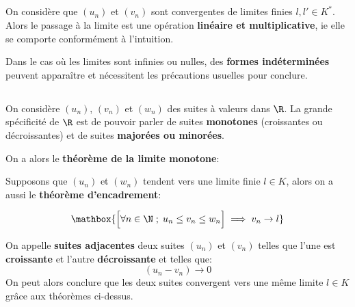 \subsection*{}
On considère que \((u_n)\) et \((v_n)\) sont convergentes de limites finies \(l, l' \in K^*\).\+
Alors le passage à la limite est une opération \textbf{linéaire et multiplicative}, ie elle se comporte conformément à l'intuition.\<

Dans le cas où les limites sont infinies ou nulles, des \textbf{formes indéterminées} peuvent apparaître et nécessitent les précautions usuelles pour conclure.

\subsection*{}
On considère \((u_n)\), \((v_n)\) et \((w_n)\) des suites à valeurs dans \(\R\). La grande spécificité de \(\R\) est de pouvoir parler de suites \textbf{monotones} (croissantes ou décroissantes) et de suites \textbf{majorées ou minorées}.\<

On a alors le \textbf{théorème de la limite monotone}:

Supposons que \((u_n)\) et \((w_n)\) tendent vers une limite finie \(l \in K\), alors on a aussi le \textbf{théorème d'encadrement}:

\[
    \mathbox{
            \Bigr[\forall n \in \N \; ; \; u_n \leq v_n \leq w_n \Bigr] \implies v_n \rightarrow l
    }
\]

On appelle \textbf{suites adjacentes} deux suites \((u_n)\) et \((v_n)\) telles que l'une est \textbf{croissante} et l'autre \textbf{décroissante} et telles que:
\[
    (u_n - v_n) \rightarrow 0
\]
On peut alors conclure que les deux suites convergent vers une même limite \(l \in K\) grâce aux théorèmes ci-dessus.

